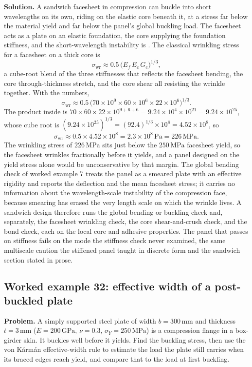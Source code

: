 \textbf{Solution.} A sandwich facesheet in compression can buckle into short
wavelengths on its own, riding on the elastic core beneath it, at a stress
far below the material yield and far below the panel's global buckling load.
The facesheet acts as a plate on an elastic foundation, the core supplying
the foundation stiffness, and the short-wavelength instability is
. The classical wrinkling stress for a facesheet on a
thick core is
\[
\sigma_{\text{wr}} \approx 0.5\,\bigl(E_f\,E_c\,G_c\bigr)^{1/3},
\]
a cube-root blend of the three stiffnesses that reflects the facesheet
bending, the core through-thickness stretch, and the core shear all resisting
the wrinkle together. With the numbers,
\[
\sigma_{\text{wr}} \approx 0.5\,\bigl(70\times 10^9\times 60\times 10^6
\times 22\times 10^6\bigr)^{1/3}.
\]
The product inside is $70\times 60\times 22\times 10^{9+6+6} = 9.24\times
10^4\times 10^{21} = 9.24\times 10^{25}$, whose cube root is
$(9.24\times 10^{25})^{1/3} = (92.4)^{1/3}\times 10^{8} = 4.52\times 10^{8}$,
so
\[
\sigma_{\text{wr}} \approx 0.5\times 4.52\times 10^{8} = 2.3\times 10^{8}\,
\text{Pa} = 226\,\text{MPa}.
\]
The wrinkling stress of $226\,\text{MPa}$ sits just below the $250\,\text{MPa}$
facesheet yield, so the facesheet wrinkles fractionally before it yields, and
a panel designed on the yield stress alone would be unconservative by that
margin. The global bending check of worked example 7 treats the panel as a
smeared plate with an effective rigidity and reports the deflection and the
mean facesheet stress; it carries no information about the wavelength-scale
instability of the compression face, because smearing has erased the very
length scale on which the wrinkle lives. A sandwich design therefore runs the
global bending or buckling check and, separately, the facesheet wrinkling
check, the core shear-and-crush check, and the bond check, each on the local
core and adhesive properties. The panel that passes on stiffness fails on the
mode the stiffness check never examined, the same multiscale caution the
stiffened panel taught in discrete form and the sandwich section stated in
prose.

\subsection*{Worked example 32: effective width of a post-buckled plate}



\textbf{Problem.} A simply supported steel plate of width $b = 300\,\si{
\milli\meter}$ and thickness $t = 3\,\si{\milli\meter}$ ($E = 200\,\text{GPa}$,
$\nu = 0.3$, $\sigma_Y = 250\,\text{MPa}$) is a compression flange in a
box-girder skin. It buckles well before it yields. Find the buckling stress,
then use the von K\'arm\'an effective-width rule to estimate the load the
plate still carries when its braced edges reach yield, and compare that to
the load at first buckling.

